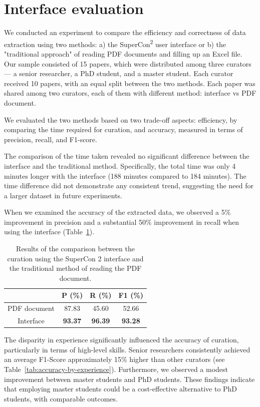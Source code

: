 \documentclass[a4paper]{article}
\begin{document}
\section{Interface evaluation}
We conducted an experiment to compare the efficiency and correctness of data extraction using two methods: a) the SuperCon\textsuperscript{2} user interface or b) the "traditional approach" of reading PDF documents and filling up an Excel file. 
Our sample consisted of 15 papers, which were distributed among three curators — a senior researcher, a PhD student, and a master student. 
Each curator received 10 papers, with an equal split between the two methods. Each paper was shared among two curators, each of them with different method: interface vs PDF document. 

We evaluated the two methods based on two trade-off aspects: efficiency, by comparing the time required for curation, and accuracy, measured in terms of precision, recall, and F1-score.

The comparison of the time taken revealed no significant difference between the interface and the traditional method. Specifically, the total time was only 4 minutes longer with the interface (188 minutes compared to 184 minutes). The time difference did not demonstrate any consistent trend, suggesting the need for a larger dataset in future experiments.

When we examined the accuracy of the extracted data, we observed a 5\% improvement in precision and a substantial 50\% improvement in recall when using the interface (Table~\ref{tab:evaluation-interface-correction}). 

\begin{table}[ht]
\centering
\begin{tabular}{c|ccc}
    & \textbf{P (\%)} & \textbf{R (\%)} & \textbf{F1 (\%)} \\
    \hline
    PDF document & 87.83 & 45.60 & 52.66 \\
    Interface & \textbf{93.37} & \textbf{96.39} & \textbf{93.28} \\
\end{tabular}
\caption{Results of the comparison between the curation using the SuperCon 2 interface and the traditional method of reading the PDF document. }
\label{tab:evaluation-interface-correction}
\end{table}

The disparity in experience significantly influenced the accuracy of curation, particularly in terms of high-level skills. Senior researchers consistently achieved an average F1-Score approximately 15\% higher than other curators (see Table~\ref{tab:accuracy-by-experience}). 
Furthermore, we observed a modest improvement between master students and PhD students. These findings indicate that employing master students could be a cost-effective alternative to PhD students, with comparable outcomes.
\end{document}
